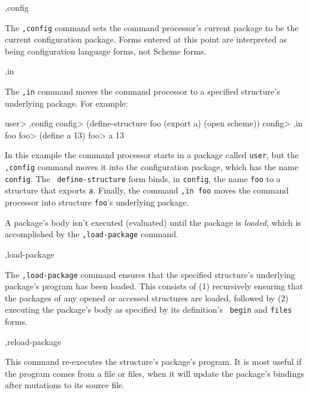 \begin{list}{}{}{}

\item
\begin{code}
,config
\end{code}
    The {\tt,config} command sets the command processor's current package
    to be the current configuration package.  Forms entered at this point are
    interpreted as being configuration language forms, not Scheme forms.

\item
\begin{code}
,in 
\end{code}
    The {\tt ,in} command moves the command processor to a specified
    structure's underlying package.  For example:
\begin{code}
    user> ,config
    config> (define-structure foo (export a)
	      (open scheme))
    config> ,in foo
    foo> (define a 13)
    foo> a
    13
\end{code}
    In this example the command processor starts in a package called
    {\tt user}, but the {\tt ,config} command moves it into the
    configuration package, which has the name {\tt config}.  The {\tt
    define-structure} form binds, in {\tt config}, the name {\tt foo} to
    a structure that exports {\tt a}.  Finally, the command {\tt ,in
    foo} moves the command processor into structure {\tt foo}'s
    underlying package.

    A package's body isn't executed (evaluated) until the package is
    {\em loaded}, which is accomplished by the {\tt ,load-package}
    command.

\item
\begin{code}
,load-package 
\end{code}
    The {\tt,load-package} command ensures that the specified structure's
    underlying package's program has been loaded.  This 
    consists of (1) recursively ensuring that the packages of any
    opened or accessed structures are loaded, followed by (2)
    executing the package's body as specified by its definition's {\tt
    begin} and {\tt files} forms.

\item
\begin{code}
,reload-package 
\end{code}
    This command re-executes the structure's package's program.  It
    is most useful if the program comes from a file or files, when
    it will update the package's bindings after mutations to its
    source file.


\end{list}
